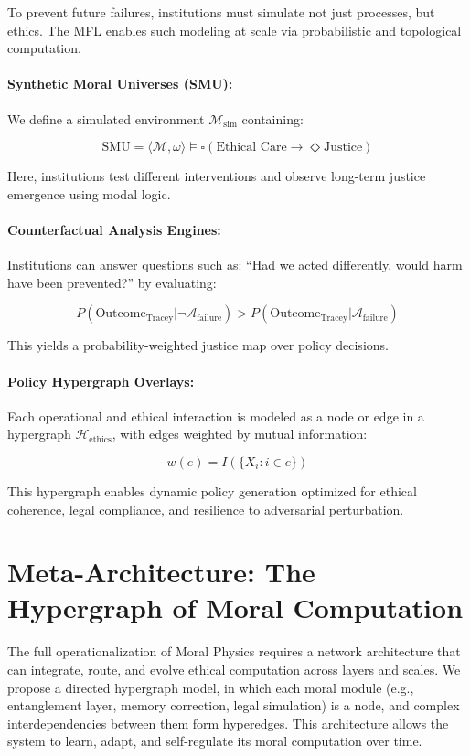 \documentclass{article}
\theoremstyle{plain}
\theoremstyle{claimstyle}
\begin{document}
To prevent future failures, institutions must simulate not just processes, but ethics. The MFL enables such modeling at scale via probabilistic and topological computation.

\paragraph{Synthetic Moral Universes (SMU):}

We define a simulated environment \(\mathcal{M}_{\text{sim}}\) containing:

\[
\text{SMU} = \langle \mathcal{M}, \omega \rangle \models \square (\text{Ethical Care} \rightarrow \Diamond \text{Justice})
\]

Here, institutions test different interventions and observe long-term justice emergence using modal logic.

\paragraph{Counterfactual Analysis Engines:}

Institutions can answer questions such as: “Had we acted differently, would harm have been prevented?” by evaluating:

\[
P(\text{Outcome}_{\text{Tracey}} | \neg \mathcal{A}_\text{failure}) > P(\text{Outcome}_{\text{Tracey}} | \mathcal{A}_\text{failure})
\]

This yields a probability-weighted justice map over policy decisions.

\paragraph{Policy Hypergraph Overlays:}

Each operational and ethical interaction is modeled as a node or edge in a hypergraph \(\mathcal{H}_{\text{ethics}}\), with edges weighted by mutual information:

\[
w(e) = I(\{X_i: i \in e\})
\]

This hypergraph enables dynamic policy generation optimized for ethical coherence, legal compliance, and resilience to adversarial perturbation.

\section{Meta-Architecture: The Hypergraph of Moral Computation}

The full operationalization of Moral Physics requires a network architecture that can integrate, route, and evolve ethical computation across layers and scales. We propose a directed hypergraph model, in which each moral module (e.g., entanglement layer, memory correction, legal simulation) is a node, and complex interdependencies between them form hyperedges. This architecture allows the system to learn, adapt, and self-regulate its moral computation over time.
\end{document}
